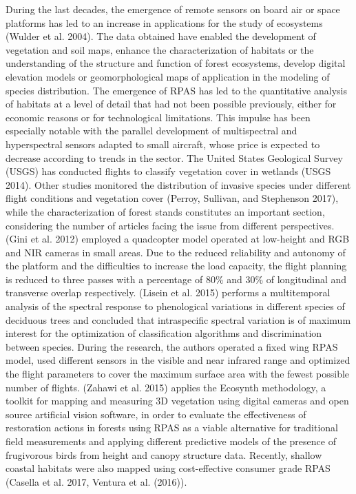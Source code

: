 \documentclass[]{interact}
\theoremstyle{plain}%
\theoremstyle{definition}
\theoremstyle{remark}
\begin{document}
During the last decades, the emergence of remote sensors on board air or
space platforms has led to an increase in applications for the study of
ecosystems (Wulder et al. 2004). The data obtained have enabled the
development of vegetation and soil maps, enhance the characterization of
habitats or the understanding of the structure and function of forest
ecosystems, develop digital elevation models or geomorphological maps of
application in the modeling of species distribution. The emergence of
RPAS has led to the quantitative analysis of habitats at a level of
detail that had not been possible previously, either for economic
reasons or for technological limitations. This impulse has been
especially notable with the parallel development of multispectral and
hyperspectral sensors adapted to small aircraft, whose price is expected
to decrease according to trends in the sector. The United States
Geological Survey (USGS) has conducted flights to classify vegetation
cover in wetlands (USGS 2014). Other studies monitored the distribution
of invasive species under different flight conditions and vegetation
cover (Perroy, Sullivan, and Stephenson 2017), while the
characterization of forest stands constitutes an important section,
considering the number of articles facing the issue from different
perspectives. (Gini et al. 2012) employed a quadcopter model operated at
low-height and RGB and NIR cameras in small areas. Due to the reduced
reliability and autonomy of the platform and the difficulties to
increase the load capacity, the flight planning is reduced to three
passes with a percentage of 80\% and 30\% of longitudinal and transverse
overlap respectively. (Lisein et al. 2015) performs a multitemporal
analysis of the spectral response to phenological variations in
different species of deciduous trees and concluded that intraspecific
spectral variation is of maximum interest for the optimization of
classification algorithms and discrimination between species. During the
research, the authors operated a fixed wing RPAS model, used different
sensors in the visible and near infrared range and optimized the flight
parameters to cover the maximum surface area with the fewest possible
number of flights. (Zahawi et al. 2015) applies the Ecosynth
methodology, a toolkit for mapping and measuring 3D vegetation using
digital cameras and open source artificial vision software, in order to
evaluate the effectiveness of restoration actions in forests using RPAS
as a viable alternative for traditional field measurements and applying
different predictive models of the presence of frugivorous birds from
height and canopy structure data. Recently, shallow coastal habitats
were also mapped using cost-effective consumer grade RPAS (Casella et
al. 2017, Ventura et al. (2016)).
\end{document}
